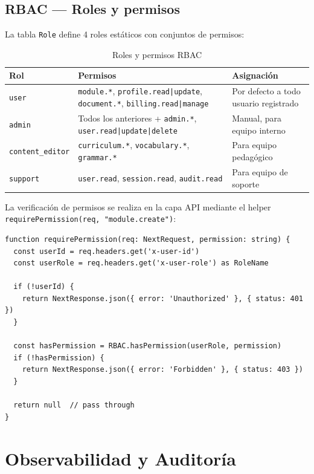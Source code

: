 \documentclass[10pt,a4paper,oneside]{report}
\begin{document}
\section{RBAC — Roles y permisos}
La tabla \texttt{Role} define 4 roles estáticos con conjuntos de permisos:

\begin{table}[H]
\centering
\begin{tabular}{p{2.5cm}p{6cm}p{4.5cm}}
\toprule
\textbf{Rol} & \textbf{Permisos} & \textbf{Asignación} \\
\midrule
\texttt{user} & \texttt{module.*}, \texttt{profile.read|update}, \texttt{document.*}, \texttt{billing.read|manage} & Por defecto a todo usuario registrado \\
\texttt{admin} & Todos los anteriores + \texttt{admin.*}, \texttt{user.read|update|delete} & Manual, para equipo interno \\
\texttt{content\_editor} & \texttt{curriculum.*}, \texttt{vocabulary.*}, \texttt{grammar.*} & Para equipo pedagógico \\
\texttt{support} & \texttt{user.read}, \texttt{session.read}, \texttt{audit.read} & Para equipo de soporte \\
\bottomrule
\end{tabular}
\caption{Roles y permisos RBAC}
\end{table}

La verificación de permisos se realiza en la capa API mediante el helper \texttt{requirePermission(req, "module.create")}:

\begin{lstlisting}[style=ts,caption={Helper requirePermission}]
function requirePermission(req: NextRequest, permission: string) {
  const userId = req.headers.get('x-user-id')
  const userRole = req.headers.get('x-user-role') as RoleName

  if (!userId) {
    return NextResponse.json({ error: 'Unauthorized' }, { status: 401 })
  }

  const hasPermission = RBAC.hasPermission(userRole, permission)
  if (!hasPermission) {
    return NextResponse.json({ error: 'Forbidden' }, { status: 403 })
  }

  return null  // pass through
}
\end{lstlisting}

\chapter{Observabilidad y Auditoría}
\end{document}
